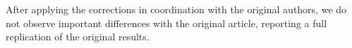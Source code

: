 
%


After applying the corrections in coordination with the original authors, we do not observe important differences with the original article, reporting a full replication of the original results.